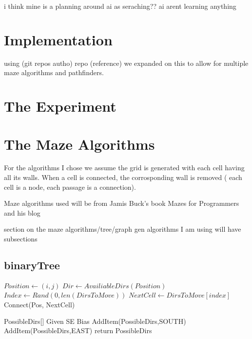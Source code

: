 \documentclass[conference]{IEEEtran}
\begin{document}
i think mine is a planning around ai as seraching?? ai arent learning anything

\section{Implementation}
using (git repos autho) repo (reference) we expanded on this to allow for multiple maze algorithms and pathfinders.


\section{The Experiment}



\section{The Maze Algorithms}

For the algorithms I chose we assume the grid is generated with each cell having all its walls. When a cell is connected, the corrosponding wall is removed ( each cell is a node, each passage is a connection).

Maze algorithms used will be from Jamis Buck's book Mazes for Programmers\cite{buckMazesProgrammersCode2015a} and his blog \cite{MazeAlgorithms}

section on the maze algorithms/tree/graph gen algorithms I am using
will have subsections
\subsection{binaryTree}

\begin{algorithm}
    \caption{Binary Tree}\label{alg:BT}
    \begin{algorithmic}[1]
         
            \State $Position \gets (i,j)$
            \State $Dir \gets AvailiableDirs(Position)$
            \State $Index \gets Rand(0,len(DirsToMove))$
            \State $NextCell \gets DirsToMove[index]$
            \State  Connect(Pos, NextCell) 
            \EndFor

            \EndFor
        \EndProcedure
            \State PossibleDirs[]
            \Comment Given SE Bias
                \State AddItem(PossibleDirs,SOUTH)
            \EndIf
                \State AddItem(PossibleDirs,EAST)
            \EndIf
            \State return PossibleDirs
        \EndFunction
    \end{algorithmic}
\end{algorithm}
\end{document}
